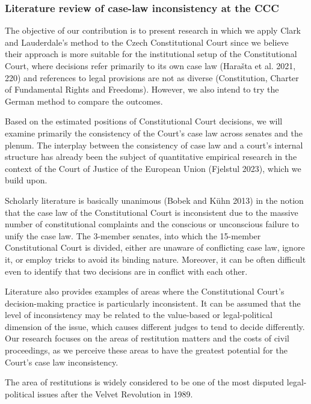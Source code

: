 \documentclass[
  11pt,
]{article}
\begin{document}
\subsubsection{Literature review of case-law inconsistency at the
CCC}\label{literature-review-of-case-law-inconsistency-at-the-ccc}

The objective of our contribution is to present research in which we
apply Clark and Lauderdale's method to the Czech Constitutional Court
since we believe their approach is more suitable for the institutional
setup of the Constitutional Court, where decisions refer primarily to
its own case law (Harašta et al. 2021, 220) and references to legal
provisions are not as diverse (Constitution, Charter of Fundamental
Rights and Freedoms). However, we also intend to try the German method
to compare the outcomes.

Based on the estimated positions of Constitutional Court decisions, we
will examine primarily the consistency of the Court's case law across
senates and the plenum. The interplay between the consistency of case
law and a court's internal structure has already been the subject of
quantitative empirical research in the context of the Court of Justice
of the European Union (Fjelstul 2023), which we build upon.

Scholarly literature is basically unanimous (Bobek and Kühn 2013) in the
notion that the case law of the Constitutional Court is inconsistent due
to the massive number of constitutional complaints and the conscious or
unconscious failure to unify the case law. The 3-member senates, into
which the 15-member Constitutional Court is divided, either are unaware
of conflicting case law, ignore it, or employ tricks to avoid its
binding nature. Moreover, it can be often difficult even to identify
that two decisions are in conflict with each other.

Literature also provides examples of areas where the Constitutional
Court's decision-making practice is particularly inconsistent. It can be
assumed that the level of inconsistency may be related to the
value-based or legal-political dimension of the issue, which causes
different judges to tend to decide differently. Our research focuses on
the areas of restitution matters and the costs of civil proceedings, as
we perceive these areas to have the greatest potential for the Court's
case law inconsistency.

The area of restitutions is widely considered to be one of the most
disputed legal-political issues after the Velvet Revolution in 1989.
\end{document}
